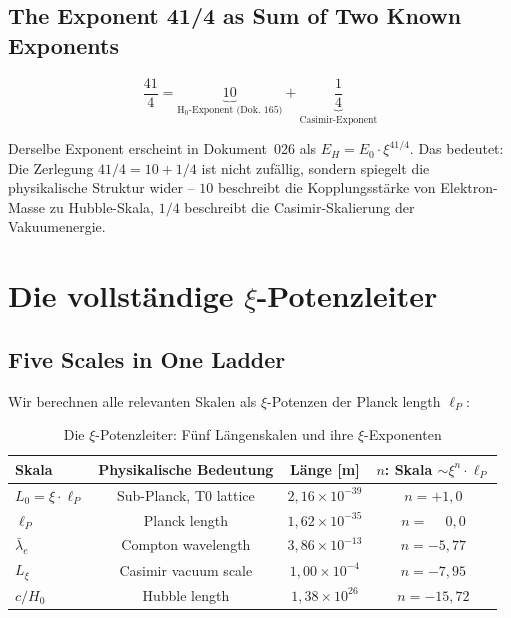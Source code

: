 \subsection{The Exponent 41/4 as Sum of Two Known Exponents}

\begin{equation}
    \frac{41}{4} = \underbrace{10}_{\text{H}_0\text{-Exponent (Dok.~165)}}
                 + \underbrace{\frac{1}{4}}_{\text{Casimir-Exponent}}
    \label{eq:exponent_decomp}
\end{equation}

Derselbe Exponent erscheint in Dokument~026 als $E_H = E_0 \cdot \xi^{41/4}$.
Das bedeutet: Die Zerlegung $41/4 = 10 + 1/4$ ist nicht zufällig, sondern
spiegelt die physikalische Struktur wider -- $10$ beschreibt die
Kopplungsstärke von Elektron-Masse zu Hubble-Skala, $1/4$ beschreibt
die Casimir-Skalierung der Vakuumenergie.

\section{Die vollständige \texorpdfstring{$\xi$}{xi}-Potenzleiter}
\label{sec:ladder}

\subsection{Five Scales in One Ladder}

Wir berechnen alle relevanten Skalen als $\xi$-Potenzen der Planck length $\ell_P$:

\begin{table}[H]
    \centering
    \caption{Die $\xi$-Potenzleiter: Fünf Längenskalen und ihre $\xi$-Exponenten}
    \label{tab:scale_ladder}
    \begin{tabular}{lccc}
        \toprule
        \textbf{Skala} & \textbf{Physikalische Bedeutung}
            & \textbf{Länge [m]} & \textbf{$n$: Skala $\sim \xi^n \cdot \ell_P$} \\
        \midrule
        $L_0 = \xi \cdot \ell_P$ & Sub-Planck, T0 lattice & $2{,}16 \times 10^{-39}$ & $n = +1{,}0$ \\
        $\ell_P$                  & Planck length           & $1{,}62 \times 10^{-35}$ & $n = \phantom{+}0{,}0$ \\
        $\bar\lambda_e$           & Compton wavelength    & $3{,}86 \times 10^{-13}$ & $n = -5{,}77$ \\
        $L_\xi$                   & Casimir vacuum scale    & $1{,}00 \times 10^{-4}$  & $n = -7{,}95$ \\
        $c/H_0$                   & Hubble length           & $1{,}38 \times 10^{26}$  & $n = -15{,}72$ \\
        \bottomrule
    \end{tabular}
\end{table}


